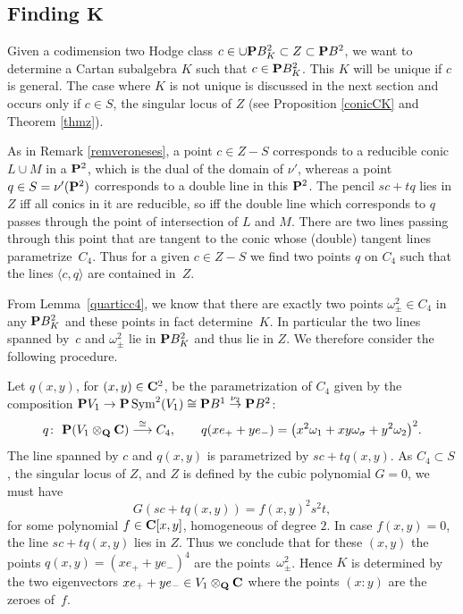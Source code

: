 \documentclass[10pt,a4paper]{amsart}
\numberwithin{equation}{section}
\begin{document}
\subsection[Finding K]{Finding $\boldsymbol{K}$} \label{findB2p}

Given a codimension two Hodge class $c\in \cup {\bf P} B^2_K\subset Z\subset {\bf P} B^2$,
we want to determine a Cartan subalgebra $K$ such that $c\in {\bf P} B^2_K$. This $K$ will be
unique if $c$ is general. The case where $K$ is not unique is discussed in the next section
and occurs only if $c\in S$, the singular locus of $Z$ (see Proposition \ref{conicCK} and
Theorem \ref{thmz}).

As in Remark \ref{remveroneses},
a point $c\in Z-S$ corresponds to a reducible conic $L\cup M$ in a ${\bf P}^2$, which is the dual of the
domain of $\nu'$,
whereas a point $q\in S=\nu'({\bf P}^2)$ corresponds to a double line in this ${\bf P}^2$.
The pencil $sc+tq$ lies in $Z$ iff all conics in it are reducible,
so iff the double line which corresponds to $q$ passes through the point of intersection of $L$ and $M$.
There are two lines passing through this point that are tangent to the conic whose (double) tangent lines
parametrize~$C_4$. Thus for a given $c\in Z-S$ we find two points $q$ on $C_4$ such that
the lines $\langle c,q\rangle $ are contained in~$Z$.

From Lemma~\ref{quarticc4}, we know that there are exactly two points
$\omega^2_\pm\in C_4$ in any ${\bf P} B^2_K$ and these points in fact determine~$K$.
In particular the two lines spanned by~$c$ and $\omega^2_\pm$
lie in ${\bf P} B^2_K$ and thus lie in $Z$.
We therefore consider the following procedure.

Let $q(x,y)$, for $(x,y)\in{\bf C}^2$, be the parametrization of $C_4$ given by the composition
${\bf P} V_1\rightarrow {\bf P} \operatorname{Sym}^2(V_1)\cong {\bf P} B^1\stackrel{\nu_2}{\rightarrow} {\bf P} B^2$:
\[
q\colon \ {\bf P} (V_1\otimes_{\bf Q}{\bf C}) \stackrel{\cong}{\longrightarrow} C_4,\qquad q(xe_++ye_-)=
\big(x^2\omega_1+xy\omega_\sigma+y^2\omega_2\big)^2.
\]
The line spanned by $c$ and $q(x,y)$ is parametrized by $sc+tq(x,y)$.
As $C_4\subset S$, the singular locus of $Z$, and $Z$ is defined by the cubic polynomial $G=0$,
we must have
\[
G(sc+tq(x,y))=f(x,y)^2s^2t,
\]
for some polynomial $f\in{\bf C}[x,y]$, homogeneous of degree $2$.
In case $f(x,y)=0$, the line $sc+tq(x,y)$ lies in $Z$.
Thus we conclude that for these $(x,y)$ the points
$q(x,y)=(xe_++ye_-)^4$ are the points~$\omega_\pm^2$. Hence $K$ is determined by the
two eigenvectors
$xe_++ye_-\in V_1\otimes_{\bf Q}{\bf C}$ where the points $(x:y)$ are the zeroes of~$f$.
\end{document}
